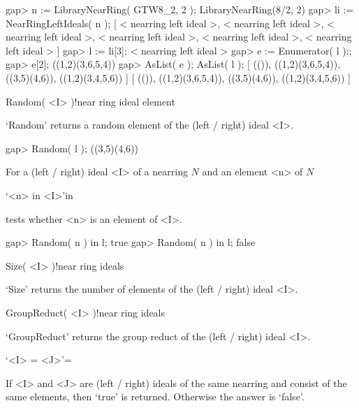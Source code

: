\beginexample
    gap> n := LibraryNearRing( GTW8_2, 2 );
    LibraryNearRing(8/2, 2)
    gap> li := NearRingLeftIdeals( n );
    [ < nearring left ideal >, < nearring left ideal >, 
      < nearring left ideal >, < nearring left ideal >, 
      < nearring left ideal >, < nearring left ideal > ]
    gap> l := li[3];
    < nearring left ideal >
    gap> e := Enumerator( l );;
    gap> e[2];
    ((1,2)(3,6,5,4))
    gap> AsList( e ); AsList( l );
    [ (()), ((1,2)(3,6,5,4)), ((3,5)(4,6)), ((1,2)(3,4,5,6)) ]
    [ (()), ((1,2)(3,6,5,4)), ((3,5)(4,6)), ((1,2)(3,4,5,6)) ]
\endexample



\>Random( <I> )!{near ring ideal element}

`Random' returns a random element of the (left / right) ideal <I>.

\beginexample
    gap> Random( l );
    ((3,5)(4,6))
\endexample



For a (left / right) ideal <I> of a nearring $N$ and an element <n> of $N$

\>`<n> in <I>'{in}

tests whether <n> is an element of <I>.

\beginexample
    gap> Random( n ) in l;
    true
    gap> Random( n ) in l;
    false
\endexample



\>Size( <I> )!{near ring ideals}

`Size' returns the number of elements of the (left / right) ideal <I>.



\>GroupReduct( <I> )!{near ring ideals}

`GroupReduct' returns the group reduct of the (left / right) ideal <I>.



\>`<I> = <J>'{=}

If <I> and <J> are (left / right) ideals of the same nearring and consist of
the same elements, then `true' is returned. Otherwise the answer is `false'.

